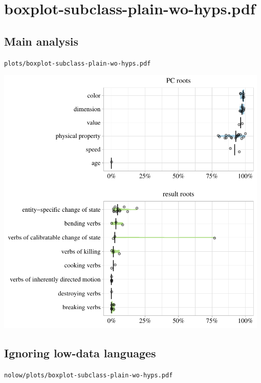 \eject

\section{boxplot-subclass-plain-wo-hyps.pdf}

\subsection{Main analysis}

\texttt{plots/boxplot-subclass-plain-wo-hyps.pdf}

\includegraphics[width=0.98\textwidth]{../plots/boxplot-subclass-plain-wo-hyps.pdf}

\subsection{Ignoring low-data languages}

\texttt{nolow/plots/boxplot-subclass-plain-wo-hyps.pdf}

